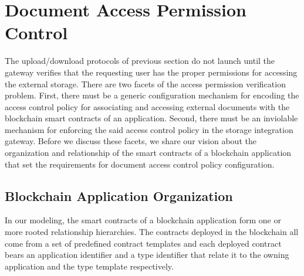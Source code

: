 
\section{Document Access Permission Control}
\label{s-accr}
The upload/download protocols of previous section do not launch until the gateway verifies that the requesting user has the proper permissions for accessing the external storage. There are two facets of the access permission verification problem. First, there must be a generic configuration mechanism for encoding the access control policy for associating and accessing external documents with the blockchain smart contracts of an application. Second, there must be an inviolable mechanism for enforcing the said access control policy in the storage integration gateway. Before we discuss these facets, we share our vision about the organization and relationship of the smart contracts of a blockchain application that set the requirements for document access control policy configuration.

\subsection{Blockchain Application Organization}
In our modeling, the smart contracts of a blockchain application form one or more rooted relationship hierarchies. The contracts deployed in the blockchain all come from a set of predefined contract templates and each deployed contract bears an application identifier and a type identifier that relate it to the owning application and the type template respectively.

